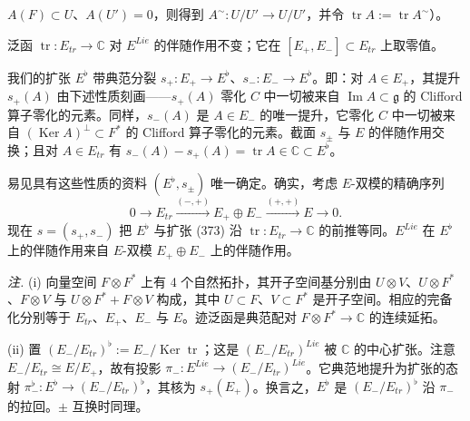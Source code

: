 

$A(F)\subset U$、$A(U')=0$，则得到 $A^{\sim}:U/U'\to U/U'$，并令 $\operatorname{tr}A:=\operatorname{tr}A^{\sim}$）。

泛函 $\operatorname{tr}:E_{tr}\to\mathbb{C}$ 对 $E^{Lie}$ 的伴随作用不变；它在 $[E_+,E_-]\subset E_{tr}$ 上取零值。

我们的扩张 $E^{\flat}$ 带典范分裂 $s_+:E_+\to E^{\flat}$、$s_-:E_-\to E^{\flat}$。即：对 $A\in E_+$，其提升 $s_+(A)$ 由下述性质刻画——$s_+(A)$ 零化 $C$ 中一切被来自 $\operatorname{Im}A\subset\mathfrak{g}$ 的 Clifford 算子零化的元素。同样，$s_-(A)$ 是 $A\in E_-$ 的唯一提升，它零化 $C$ 中一切被来自 $(\operatorname{Ker}A)^{\perp}\subset F^{*}$ 的 Clifford 算子零化的元素。截面 $s_{\pm}$ 与 $E$ 的伴随作用交换；且对 $A\in E_{tr}$ 有 $s_-(A)-s_+(A)=\operatorname{tr}A\in\mathbb{C}\subset E^{\flat}$。

易见具有这些性质的资料 $(E^{\flat},s_{\pm})$ 唯一确定。确实，考虑 $E$-双模的精确序列
\begin{equation}\tag{373}
0\to E_{tr}\xrightarrow{(-,+)}E_+\oplus E_-\xrightarrow{(+,+)}E\to 0.
\end{equation}
现在 $s=(s_+,s_-)$ 把 $E^{\flat}$ 与扩张 (373) 沿 $\operatorname{tr}:E_{tr}\to\mathbb{C}$ 的前推等同。$E^{Lie}$ 在 $E^{\flat}$ 上的伴随作用来自 $E$-双模 $E_+\oplus E_-$ 上的伴随作用。

\emph{注.} (i) 向量空间 $F\otimes F^{*}$ 上有 4 个自然拓扑，其开子空间基分别由 $U\otimes V$、$U\otimes F^{*}$、$F\otimes V$ 与 $U\otimes F^{*}+F\otimes V$ 构成，其中 $U\subset F$、$V\subset F^{*}$ 是开子空间。相应的完备化分别等于 $E_{tr}$、$E_+$、$E_-$ 与 $E$。迹泛函是典范配对 $F\otimes F^{*}\to\mathbb{C}$ 的连续延拓。

(ii) 置 $(E_-/E_{tr})^{\flat}:=E_-/\operatorname{Ker}\operatorname{tr}$；这是 $(E_-/E_{tr})^{Lie}$ 被 $\mathbb{C}$ 的中心扩张。注意 $E_-/E_{tr}\cong E/E_+$，故有投影 $\pi_-:E^{Lie}\to(E_-/E_{tr})^{Lie}$。它典范地提升为扩张的态射 $\pi^{\flat}_-:E^{\flat}\to(E_-/E_{tr})^{\flat}$，其核为 $s_+(E_+)$。换言之，$E^{\flat}$ 是 $(E_-/E_{tr})^{\flat}$ 沿 $\pi_-$ 的拉回。$\pm$ 互换时同理。

